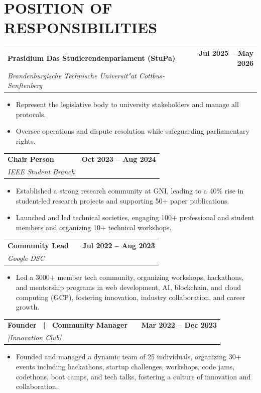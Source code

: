 \documentclass[a4paper,11pt]{article}
\makeatletter
\newcommand{\entryheader}[4]{%
  \begin{tabularx}{\textwidth}{@{}>{\RaggedRight\arraybackslash}X r@{}}
    \textbf{#1} & \textbf{#2} \\
    \textit{#3} & \textit{#4} \\
  \end{tabularx}%
}
\newenvironment{entrybullets}{%
  \begin{minipage}[t]{0.77\textwidth}
    \begin{itemize}[leftmargin=*,label=\textbullet,align=left]
}{%
    \end{itemize}
  \end{minipage}
}
\newcommand{\extlink}{\raisebox{0.2ex}{\scriptsize\faExternalLink*}}
\makeatother
\begin{document}
\section*{POSITION OF RESPONSIBILITIES}
\entryheader{Prasidium Das Studierendenparlament (StuPa)}{Jul 2025 -- May 2026}{Brandenburgische Technische Universit"at Cottbus-Senftenberg}{}
\begin{entrybullets}
  \item Represent the legislative body to university stakeholders and manage all protocols.
  \item Oversee operations and dispute resolution while safeguarding parliamentary rights.
\end{entrybullets}

\vspace{0.25cm}
\entryheader{Chair Person}{Oct 2023 -- Aug 2024}{IEEE Student Branch}{}
\begin{entrybullets}
  \item Established a strong research community at GNI, leading to a 40\% rise in student-led research projects and supporting 50+ paper publications.
  \item Launched and led technical societies, engaging 100+ professional and student members and organizing 10+ technical workshops.
\end{entrybullets}

\vspace{0.25cm}
\newpage
\thispagestyle{secondpage}

\entryheader{Community Lead \ \extlink}{Jul 2022 -- Aug 2023}{Google DSC}{}
\begin{entrybullets}
  \item Led a 3000+ member tech community, organizing workshops, hackathons, and mentorship programs in web development, AI, blockchain, and cloud computing (GCP), fostering innovation, industry collaboration, and career growth.
\end{entrybullets}

\vspace{0.25cm}
\entryheader{Founder \ | \ Community Manager \ \extlink}{Mar 2022 -- Dec 2023}{[Innovation Club]}{}
\begin{entrybullets}
  \item Founded and managed a dynamic team of 25 individuals, organizing 30+ events including hackathons, startup challenges, workshops, code jams, codethons, boot camps, and tech talks, fostering a culture of innovation and collaboration.
\end{entrybullets}
\end{document}
